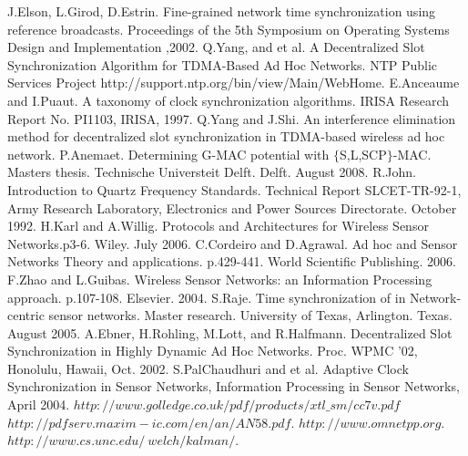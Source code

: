\documentclass[journal]{IEEEtran}
\begin{document}
\begin{thebibliography}{\textbf{References}}
J.Elson, L.Girod, D.Estrin. Fine-grained network time synchronization using reference broadcasts. Proceedings of the 5th Symposium on Operating Systems Design and Implementation ,2002.
Q.Yang, and et al. A Decentralized Slot Synchronization Algorithm for TDMA-Based Ad Hoc Networks.
NTP Public Services Project http://support.ntp.org/bin/view/Main/WebHome.
E.Anceaume and I.Puaut. A taxonomy of clock synchronization algorithms. IRISA Research Report No. PI1103, IRISA, 1997.
Q.Yang and J.Shi. An interference elimination method for decentralized slot synchronization in TDMA-based wireless ad hoc network.
 P.Anemaet. Determining G-MAC potential with $\{$S,L,SCP$\}$-MAC. Masters thesis. Technische Universteit Delft. Delft. August 2008.
R.John. Introduction to Quartz Frequency Standards. Technical Report SLCET-TR-92-1, Army Research Laboratory, Electronics and Power Sources Directorate. October 1992.
H.Karl and A.Willig. Protocols and Architectures for Wireless Sensor Networks.p3-6. Wiley. July 2006.
C.Cordeiro and D.Agrawal. Ad hoc and Sensor Networks Theory and applications. p.429-441. World Scientific Publishing. 2006.
F.Zhao and  L.Guibas. Wireless Sensor Networks: an Information Processing approach. p.107-108. Elsevier. 2004.
 S.Raje. Time synchronization of in Network-centric sensor networks. Master research. University of Texas, Arlington. Texas. August 2005.
A.Ebner, H.Rohling, M.Lott, and R.Halfmann. Decentralized Slot Synchronization in Highly Dynamic Ad Hoc Networks. Proc. WPMC '02, Honolulu, Hawaii, Oct. 2002.
S.PalChaudhuri and et al. Adaptive Clock Synchronization in Sensor Networks, Information Processing in Sensor Networks, April 2004.
 $http://www.golledge.co.uk/pdf/products/xtl\_sm/cc7v.pdf$
 $http://pdfserv.maxim-ic.com/en/an/AN58.pdf$.
$http://www.omnetpp.org$.
$http://www.cs.unc.edu/~welch/kalman/$.
\end{thebibliography}
\end{document}
